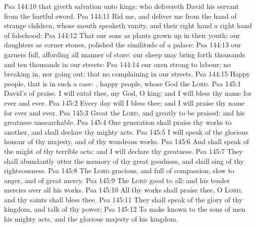 \vs Psa 144:10  that giveth salvation unto kings: who delivereth David his servant from the hurtful sword.
\vs Psa 144:11 Rid me, and deliver me from the hand of strange children, whose mouth speaketh vanity, and their right hand  a right hand of falsehood:
\vs Psa 144:12 That our sons  as plants grown up in their youth;  our daughters  as corner stones, polished  the similitude of a palace:
\vs Psa 144:13  our garners  full, affording all manner of store:  our sheep may bring forth thousands and ten thousands in our streets:
\vs Psa 144:14  our oxen  strong to labour;  no breaking in, nor going out; that  no complaining in our streets.
\vs Psa 144:15 Happy  people, that is in such a case: , happy  people, whose God  the \textsc{Lord}.
\vs Psa 145:1 David's  of praise. I will extol thee, my God, O king; and I will bless thy name for ever and ever.
\vs Psa 145:2 Every day will I bless thee; and I will praise thy name for ever and ever.
\vs Psa 145:3 Great  the \textsc{Lord}, and greatly to be praised; and his greatness  unsearchable.
\vs Psa 145:4 One generation shall praise thy works to another, and shall declare thy mighty acts.
\vs Psa 145:5 I will speak of the glorious honour of thy majesty, and of thy wondrous works.
\vs Psa 145:6 And  shall speak of the might of thy terrible acts: and I will declare thy greatness.
\vs Psa 145:7 They shall abundantly utter the memory of thy great goodness, and shall sing of thy righteousness.
\vs Psa 145:8 The \textsc{Lord}  gracious, and full of compassion; slow to anger, and of great mercy.
\vs Psa 145:9 The \textsc{Lord}  good to all: and his tender mercies  over all his works.
\vs Psa 145:10 All thy works shall praise thee, O \textsc{Lord}; and thy saints shall bless thee.
\vs Psa 145:11 They shall speak of the glory of thy kingdom, and talk of thy power;
\vs Psa 145:12 To make known to the sons of men his mighty acts, and the glorious majesty of his kingdom.
